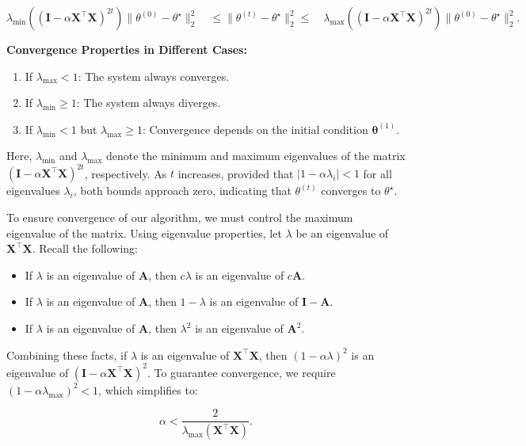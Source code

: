 \[
    \lambda_{\min}((\mathbf{I} - \alpha \boldsymbol{X}^\top \boldsymbol{X})^{2t}) \|\theta^{(0)} - \theta^\star\|_2^2 \quad \leq \|\theta^{(t)} - \theta^\star\|_2^2  \leq \quad \lambda_{\max}((\mathbf{I} - \alpha \boldsymbol{X}^\top \boldsymbol{X})^{2t}) \|\theta^{(0)} - \theta^\star\|_2^2.
\]

\textbf{Convergence Properties in Different Cases:}
\begin{enumerate}
    \item If \(\lambda_{\max} < 1\): The system always converges.
    \item If \(\lambda_{\min} \geq 1\): The system always diverges.
    \item If \(\lambda_{\min} < 1\) but \(\lambda_{\max} \geq 1\): Convergence depends on the initial condition \(\boldsymbol{\theta}^{(1)}\).
\end{enumerate}



Here, \(\lambda_{\min}\) and \(\lambda_{\max}\) denote the minimum and maximum eigenvalues of the matrix \((\mathbf{I} - \alpha \boldsymbol{X}^\top \boldsymbol{X})^{2t}\), respectively. As \(t\) increases, provided that \(|1 - \alpha \lambda_i| < 1\) for all eigenvalues \(\lambda_i\), both bounds approach zero, indicating that \(\theta^{(t)}\) converges to \(\theta^\star\).


To ensure convergence of our algorithm, we must control the maximum eigenvalue of the matrix. Using eigenvalue properties, let \(\lambda\) be an eigenvalue of \(\mathbf{X}^\top \mathbf{X}\). Recall the following:
\begin{itemize}
    \item If \(\lambda\) is an eigenvalue of \(\mathbf{A}\), then \(c\lambda\) is an eigenvalue of \(c\mathbf{A}\).
    \item If \(\lambda\) is an eigenvalue of \(\mathbf{A}\), then \(1 - \lambda\) is an eigenvalue of \(\mathbf{I} - \mathbf{A}\).
    \item If \(\lambda\) is an eigenvalue of \(\mathbf{A}\), then \(\lambda^2\) is an eigenvalue of \(\mathbf{A}^2\).
\end{itemize}

Combining these facts, if \(\lambda\) is an eigenvalue of \(\mathbf{X}^\top \mathbf{X}\), then \((1 - \alpha \lambda)^2\) is an eigenvalue of \((\mathbf{I} - \alpha \mathbf{X}^\top \mathbf{X})^2\). To guarantee convergence, we require \((1 - \alpha \lambda_{\max})^2 < 1\), which simplifies to:

\[
\alpha < \frac{2}{\lambda_{\max}(\mathbf{X}^\top \mathbf{X})}.
\]
